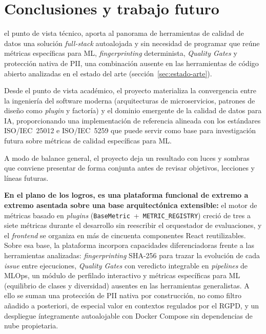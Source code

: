 \chapter{Conclusiones y trabajo futuro}
\label{chap:conclusiones}

 el punto de vista técnico, \dataqual aporta al panorama de
herramientas de calidad de datos una solución \emph{full-stack} autoalojada y
sin necesidad de programar que reúne métricas específicas para \ac{ML},
\emph{fingerprinting} determinista, \emph{Quality Gates} y protección nativa de
\ac{PII}, una combinación ausente en las herramientas de código abierto
analizadas en el estado del arte (sección~\ref{sec:estado-arte}).

Desde el punto de vista académico, el proyecto materializa la convergencia entre
la ingeniería del software moderna (arquitecturas de microservicios, patrones de
diseño como \emph{plugin} y factoría) y el dominio emergente de la calidad de
datos para \ac{IA}, proporcionando una implementación de referencia alineada
con los estándares \ac{ISO}/\ac{IEC}~25012 e \ac{ISO}/\ac{IEC}~5259 que puede servir como
base para investigación futura sobre métricas de calidad específicas para
\ac{ML}.

A modo de balance general, el proyecto deja un resultado con luces y sombras
que conviene presentar de forma conjunta antes de revisar objetivos, lecciones
y líneas futuras.

\textbf{En el plano de los logros, \dataqual es una plataforma funcional de
extremo a extremo asentada sobre una base arquitectónica extensible:} el motor
de métricas basado en \emph{plugins} (\texttt{BaseMetric}~+~\texttt{METRIC\_REGISTRY})
creció de tres a siete métricas durante el desarrollo sin reescribir el
orquestador de evaluaciones, y el \emph{frontend} se organiza en más de
cincuenta componentes React reutilizables.  Sobre esa base, la plataforma
incorpora capacidades diferenciadoras frente a las herramientas analizadas:
\emph{fingerprinting} \ac{SHA}-256 para trazar la evolución de cada \emph{issue}
entre ejecuciones, \emph{Quality Gates} con veredicto integrable en
\emph{pipelines} de \ac{MLOps}, un módulo de perfilado interactivo y métricas
específicas para \ac{ML} (equilibrio de clases y diversidad) ausentes en las
herramientas generalistas.  A ello se suman una protección de \ac{PII} nativa
por construcción, no como filtro añadido a posteriori, de especial valor en
contextos regulados por el \ac{RGPD}, y un despliegue íntegramente autoalojable
con Docker Compose sin dependencias de nube propietaria.

